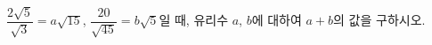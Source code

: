 $\dfrac{2\sqrt{5}}{\sqrt{3}}=a\sqrt{15}$, $\dfrac{20}{\sqrt{45}}=b\sqrt{5}$일 때, 유리수 $a$, $b$에 대하여 $a+b$의 값을 구하시오.
